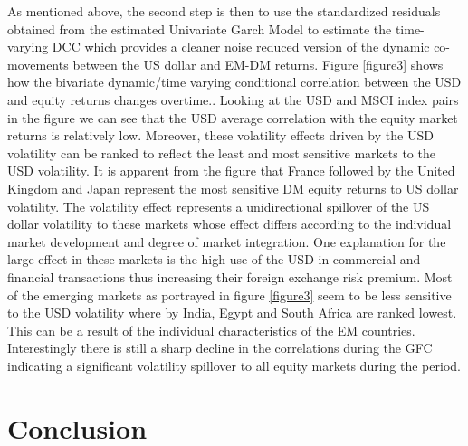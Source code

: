 \documentclass[11pt,preprint, authoryear]{elsarticle}
\numberwithin{equation}{section}
\numberwithin{figure}{section}
\numberwithin{table}{section}
\begin{document}
As mentioned above, the second step is then to use the standardized
residuals obtained from the estimated Univariate Garch Model to estimate
the time-varying DCC which provides a cleaner noise reduced version of
the dynamic co-movements between the US dollar and EM-DM returns. Figure
\ref{figure3} shows how the bivariate dynamic/time varying conditional
correlation between the USD and equity returns changes overtime..
Looking at the USD and MSCI index pairs in the figure we can see that
the USD average correlation with the equity market returns is relatively
low. Moreover, these volatility effects driven by the USD volatility can
be ranked to reflect the least and most sensitive markets to the USD
volatility. It is apparent from the figure that France followed by the
United Kingdom and Japan represent the most sensitive DM equity returns
to US dollar volatility. The volatility effect represents a
unidirectional spillover of the US dollar volatility to these markets
whose effect differs according to the individual market development and
degree of market integration. One explanation for the large effect in
these markets is the high use of the USD in commercial and financial
transactions thus increasing their foreign exchange risk premium. Most
of the emerging markets as portrayed in figure \ref{figure3} seem to be
less sensitive to the USD volatility where by India, Egypt and South
Africa are ranked lowest. This can be a result of the individual
characteristics of the EM countries. Interestingly there is still a
sharp decline in the correlations during the GFC indicating a
significant volatility spillover to all equity markets during the
period.

\hypertarget{conclusion}{%
\section{Conclusion}\label{conclusion}}
\end{document}
